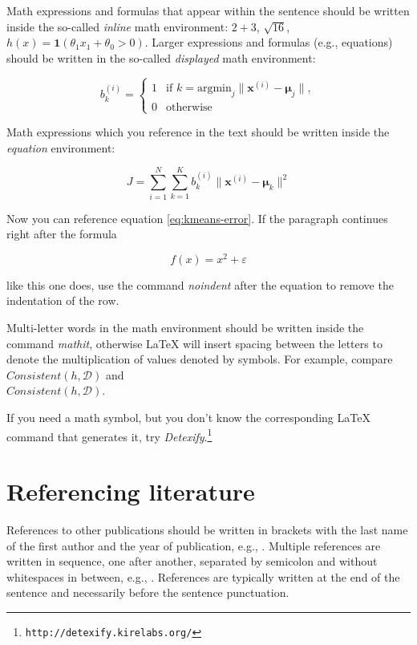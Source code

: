 \documentclass[10pt, a4paper]{article}
\begin{document}
Math expressions and formulas that appear within the sentence should be written inside the so-called \emph{inline} math environment: $2+3$, $\sqrt{16}$, $h(x)=\mathbf{1}(\theta_1 x_1 + \theta_0>0)$. Larger expressions and formulas (e.g., equations) should be written in the so-called \emph{displayed} math environment:

\[
b^{(i)}_k = \begin{cases}
1 & \text{if 
    $k = \text{argmin}_j \| \mathbf{x}^{(i)} - \mathbf{\mu}_j \|,$}\\
0 & \text{otherwise}
\end{cases}
\]

Math expressions which you reference in the text should be written inside the \textit{equation} environment:

\begin{equation}\label{eq:kmeans-error}
J = \sum_{i=1}^N \sum_{k=1}^K 
b^{(i)}_k \| \mathbf{x}^{(i)} - \mathbf{\mu}_k \|^2
\end{equation}

Now you can reference equation \eqref{eq:kmeans-error}. If the paragraph continues right after the formula

\begin{equation}
f(x) = x^2 + \varepsilon
\end{equation}

\noindent like this one does, use the command \emph{noindent} after the equation to remove the indentation of the row. 

Multi-letter words in the math environment should be written inside the command \emph{mathit}, otherwise \LaTeX{} will insert spacing between the letters to denote the multiplication of values denoted by symbols. For example, compare
$\mathit{Consistent}(h,\mathcal{D})$ and\\
$Consistent(h,\mathcal{D})$.

If you need a math symbol, but you don't know the corresponding \LaTeX{} command that generates it, try
\emph{Detexify}.\footnote{\texttt{http://detexify.kirelabs.org/}}

\section{Referencing literature}

References to other publications should be written in brackets with the last name of the first author and the year of publication, e.g., \citep{chomsky-73}.  Multiple references are written in sequence, one after another, separated by semicolon and without whitespaces in between, e.g., \citep{chomsky-73,chave-64,feigl-58}. References are typically written at the end of the sentence and necessarily before the sentence punctuation.
\end{document}
